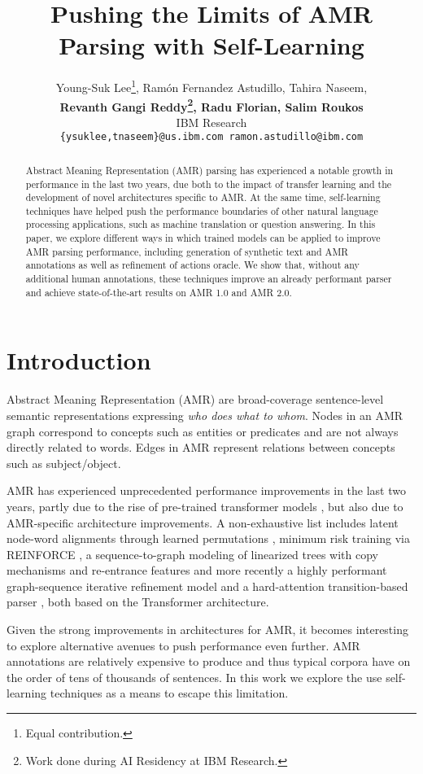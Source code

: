 \documentclass[11pt,a4paper]{article}
\title{Pushing the Limits of AMR Parsing with Self-Learning}
\author{Young-Suk Lee\thanks{\hspace{2mm}Equal contribution.},  Ram\'{o}n Fernandez Astudillo\footnotemark[1], Tahira Naseem\footnotemark[1], \\ \textbf{Revanth Gangi Reddy\footnotemark[1]\hspace{1.5mm}\thanks{\hspace{2mm}Work done during AI Residency at IBM Research.}, Radu Florian, Salim Roukos}
\\
IBM Research\\
\texttt{\{ysuklee,tnaseem\}@us.ibm.com  ramon.astudillo@ibm.com} \\}
\date{}
\begin{document}
\maketitle
\begin{abstract}
Abstract Meaning Representation (AMR) parsing has experienced a notable growth in performance in the last two years, due both to the impact of transfer learning and the development of novel architectures specific to AMR. At the same time, self-learning techniques have helped push the performance boundaries of other natural language processing applications, such as machine translation or question answering. In this paper, we explore different ways in which trained models can be applied to improve AMR parsing performance, including generation of synthetic text and AMR annotations as well as refinement of actions oracle. We show that, without any additional human annotations, these techniques improve an already performant parser and achieve state-of-the-art results on AMR 1.0 and AMR 2.0.\end{abstract}

\section{Introduction}
\label{section:intro}
Abstract Meaning Representation (AMR) are broad-coverage sentence-level semantic representations expressing \textit{who does what to whom}. Nodes in an AMR graph correspond to concepts such as entities or predicates and are not always directly related to words. Edges in AMR represent relations between concepts such as subject/object.

AMR has experienced unprecedented performance improvements in the last two years, partly due to the rise of pre-trained transformer models \cite{radford2019language,devlin-etal-2019-bert,liu2019roberta}, but also due to AMR-specific architecture improvements. A non-exhaustive list includes latent node-word alignments through learned permutations \cite{lyu-titov-2018-amr}, minimum risk training via REINFORCE \cite{naseem-etal-2019-rewarding}, a sequence-to-graph modeling of linearized trees with copy mechanisms and re-entrance features \cite{zhang-etal-2019-amr} and more recently a highly performant graph-sequence iterative refinement model \cite{cai2020amr} and a hard-attention transition-based parser \cite{anon2020a}, both based on the Transformer architecture.

Given the strong improvements in architectures for AMR, it becomes interesting to explore alternative avenues to push performance even further. AMR annotations are relatively expensive to produce and thus typical corpora have on the order of tens of thousands of sentences. In this work we explore the use self-learning techniques as a means to escape this limitation. 
\end{document}
